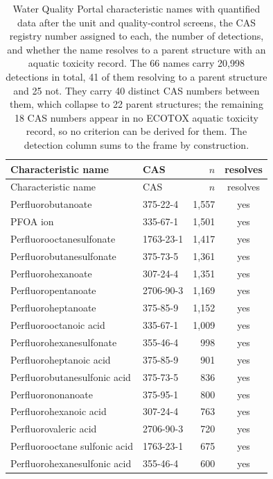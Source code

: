 \begin{longtable}{@{}>{\raggedright\arraybackslash}p{72mm} l r c@{}}
\caption{Water Quality Portal characteristic names with quantified data after the unit and quality-control screens, the CAS registry number assigned to each, the number of detections, and whether the name resolves to a parent structure with an aquatic toxicity record. The 66 names carry 20,998 detections in total, 41 of them resolving to a parent structure and 25 not. They carry 40 distinct CAS numbers between them, which collapse to 22 parent structures; the remaining 18 CAS numbers appear in no ECOTOX aquatic toxicity record, so no criterion can be derived for them. The detection column sums to the frame by construction.}
\label{tab:inv}\\
\toprule
Characteristic name & CAS & $n$ & resolves \\
\midrule
\endfirsthead
\toprule
Characteristic name & CAS & $n$ & resolves \\
\midrule
\endhead
\bottomrule
\endfoot
\sloppy Perfluorobutanoate & 375-22-4 & 1,557 & yes \\
\sloppy PFOA ion & 335-67-1 & 1,501 & yes \\
\sloppy Perfluorooctanesulfonate & 1763-23-1 & 1,417 & yes \\
\sloppy Perfluorobutanesulfonate & 375-73-5 & 1,361 & yes \\
\sloppy Perfluorohexanoate & 307-24-4 & 1,351 & yes \\
\sloppy Perfluoropentanoate & 2706-90-3 & 1,169 & yes \\
\sloppy Perfluoroheptanoate & 375-85-9 & 1,152 & yes \\
\sloppy Perfluorooctanoic acid & 335-67-1 & 1,009 & yes \\
\sloppy Perfluorohexanesulfonate & 355-46-4 & 998 & yes \\
\sloppy Perfluoroheptanoic acid & 375-85-9 & 901 & yes \\
\sloppy Perfluorobutanesulfonic acid & 375-73-5 & 836 & yes \\
\sloppy Perfluorononanoate & 375-95-1 & 800 & yes \\
\sloppy Perfluorohexanoic acid & 307-24-4 & 763 & yes \\
\sloppy Perfluorovaleric acid & 2706-90-3 & 720 & yes \\
\sloppy Perfluorooctane sulfonic acid & 1763-23-1 & 675 & yes \\
\sloppy Perfluorohexanesulfonic acid & 355-46-4 & 600 & yes \\

\end{longtable}
